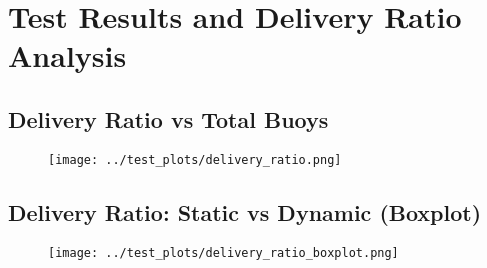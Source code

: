 \documentclass{article}
\begin{document}
\section*{Test Results and Delivery Ratio Analysis}

\subsection*{Delivery Ratio vs Total Buoys}

\begin{figure}[H]
    \centering
    \texttt{[image: ../test\_plots/delivery\_ratio.png]}
    \label{fig:delivery-ratio-vs-buoys}
\end{figure}

\subsection*{Delivery Ratio: Static vs Dynamic (Boxplot)}

\begin{figure}[H]
    \centering
    \texttt{[image: ../test\_plots/delivery\_ratio\_boxplot.png]}
    \label{fig:delivery-ratio-boxplot}
\end{figure}
\end{document}
